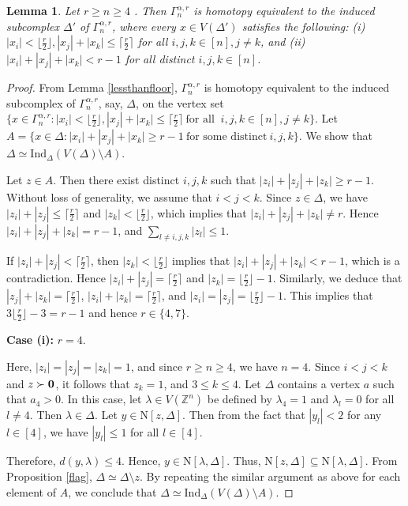 \documentclass{amsart}
\newtheorem{lemma}[theorem]{Lemma}
\theoremstyle{definition}
\theoremstyle{remark}
\numberwithin{equation}{section}
\newcommand{\D}{\Delta}
\newcommand{\f}{\lfloor\frac{r}{2}\rfloor}
\newcommand{\cil}{\lceil\frac{r}{2}\rceil}
\def\Z{{\mathbb{Z}}}
\def\n{{\mathrm{N}}}
\begin{document}
\begin{lemma}\label{sumofthree}
	Let $r\geq n\geq 4$ . Then $\Gamma_n^{\alpha, r}$ is homotopy equivalent to the induced subcomplex $\Delta'$ of $\Gamma_n^{\alpha, r}$, where every $x \in V(\Delta')$ satisfies the following: (i) $|x_i|< \f, |x_j|+|x_k|\leq \cil$ for all $i, j, k \in [n], j \neq k$, and (ii) $|x_i| + |x_j| + |x_k| < r-1$ for all distinct $i, j, k \in [n]$. 
\end{lemma}
\begin{proof}
	From Lemma \ref{lessthanfloor}, $\Gamma_n^{\alpha, r}$ is homotopy equivalent to the induced subcomplex of $\Gamma_n^{\alpha, r}$, say, $\D$, on the vertex set  $\{x\in \Gamma_n^{\alpha, r}: |x_i|< \f,  |x_j|+|x_k|\leq \cil \ \text{for all } \ i,j,k\in [n], j\neq k \}$.
	Let $A=\{x\in \D:|x_i| + |x_j| + |x_k| \geq r-1 \ \text{for some distinct}\  i,j,k \}$.
	We show that $\D\simeq \mathrm{Ind}_{\Delta}(V(\D)\setminus A)$.
	
	
	Let $z \in A$. Then there exist distinct $i, j, k$ such that $|z_i|+|z_j|+|z_k| \geq r-1$. Without loss of generality, we assume that $i<j<k$. Since $z \in \Delta$, we have
	$|z_i|+|z_j|\leq \cil$ and $|z_k|<\f$, which implies that  $|z_i|+|z_j|+|z_k| \neq  r$. Hence $|z_i|+|z_j|+|z_k| =  r-1$, and  $\sum_{l \neq i,j,k} |z_l| \leq 1$.
	
	If $|z_i| + |z_j| < \cil$, then  $|z_k| < \f$ implies that $|z_i| + |z_j| + |z_k| < r - 1$, which is a contradiction. Hence $|z_i| + |z_j| = \cil$ and $|z_k| = \f - 1$.
	Similarly, we deduce that $|z_j| + |z_k| = \cil$, $|z_i| + |z_k| = \cil$, and $|z_i| = |z_j| = \f - 1$. This  implies that $3 \f -3 = r-1$ and hence $r \in \{4, 7\}$.
	
	\medskip
	
	\noindent\textbf{Case (i):} $r=4$. 
	
	
	
	\noindent Here, $|z_i|= |z_j| = |z_k| = 1$, and since $r\geq n\geq 4$, we have $n=4$. Since $i<j<k$ and $z\succ {\bf{0}}$, it follows that $z_k=1$, and  $3\leq k\leq 4$. 
	Let $\D$ contains a vertex $a$ such that $a_4>0$. In this case, let $\lambda\in V(\Z^n)$ be defined by $\lambda_4 = 1$ and $\lambda_l = 0$ for all $l \neq 4$. Then $\lambda\in \D$.
	Let $y\in \n[z,\D]$. Then from the fact that $|y_{l}|<2$ for any $l\in [4]$,  we have $|y_l| \leq 1$ for all $l\in [4]$. 
	
	Therefore, $d(y, \lambda) \leq 4$.
	Hence, $y\in \n[\lambda,\D]$. Thus, $\n[z,\D]\subseteq \n[\lambda,\D]$. From Proposition \ref{flag}, $\D\simeq \D \setminus z$. By repeating the similar argument as above for each element of $A$, we conclude that  $\D\simeq \mathrm{Ind}_{\D}(V(\D)\setminus A)$.
	

\end{proof}
\end{document}
